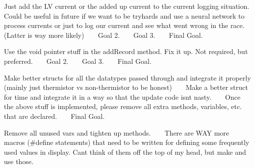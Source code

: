 \begin{DoxyRefList}
\item[File \mbox{\hyperlink{_data_logging_8h}{Data\+Logging.h}} ]\label{todo__todo000004}%
%
 Just add the LV current or the added up current to the current logging situation. Could be useful in future if we want to be tryhards and use a neural network to process currents or just to log our current and see what went wrong in the race. (Latter is way more likely) ~\newline
 ~\newline
 Goal 2. ~\newline
 ~\newline
 Goal 3. ~\newline
 ~\newline
 Final Goal.  
\item[File \mbox{\hyperlink{_data_logging_8ino}{Data\+Logging.ino}} ]\label{todo__todo000005}%
%
 Use the void pointer stuff in the add\+Record method. Fix it up. Not required, but preferred. ~\newline
 ~\newline
 Goal 2. ~\newline
 ~\newline
 Goal 3. ~\newline
 ~\newline
 Final Goal.  
\item[File \mbox{\hyperlink{_display_8h}{Display.h}} ]\label{todo__todo000006}%
%
 Make better structs for all the datatypes passed through and integrate it properly (mainly just thermistor vs non-\/thermistor to be honest) ~\newline
 ~\newline
 Make a better struct for time and integrate it in a way so that the update code isn\textquotesingle{}t nasty. ~\newline
 ~\newline
 Once the above stuff is implemented, please remove all extra methods, variables, etc. that are declared. ~\newline
 ~\newline
 Final Goal.  
\item[File \mbox{\hyperlink{_display_8ino}{Display.ino}} ]\label{todo__todo000007}%
%
 Remove all unused vars and tighten up methods. ~\newline
 ~\newline
 There are WAY more macros (\#define statements) that need to be written for defining some frequently used values in display. Can\textquotesingle{}t think of them off the top of my head, but make and use those. ~\newline

\end{DoxyRefList}
